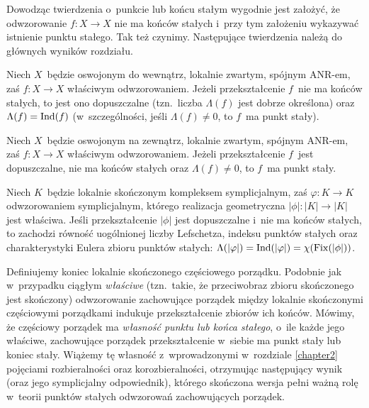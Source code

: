 Dowodząc twierdzenia o~punkcie lub końcu stałym wygodnie jest założyć, że odwzorowanie $f\colon X\to X$ nie ma końców stałych i~przy tym założeniu wykazywać istnienie punktu stałego. Tak też czynimy. Następujące twierdzenia należą do głównych wyników rozdziału.

\begin{tw*}[\ref{tw-lefschetz_fpt_dla_reverse_tame}]
Niech $X$~będzie oswojonym do wewnątrz, lokalnie zwartym, spójnym \mbox{ANR-em}, zaś $f\colon X\to X$ właściwym odwzorowaniem. Jeżeli przekształcenie $f$~nie ma końców stałych, to jest ono dopuszczalne (tzn.~liczba $\Lambda(f)$ jest dobrze określona) oraz~$\Lambda(f)=\operatorname{Ind}(f)$ (w~szczególności, jeśli $\Lambda(f)\not=0$, to $f$~ma punkt stały).
\end{tw*}

\begin{tw*}[\ref{tw-lefschetz_fpt_dla_forward_tame}]
Niech $X$~będzie oswojonym na zewnątrz, lokalnie zwartym, spójnym \mbox{ANR-em}, zaś $f\colon X\to X$ właściwym odwzorowaniem. Jeżeli przekształcenie $f$~jest dopuszczalne, nie ma końców stałych oraz $\Lambda(f)\not=0$, to $f$~ma punkt stały.
\end{tw*}

\begin{tw*}[\ref{wn-simplicial-fixed-point-or-end-theorem}, \ref{tw-rownosc_indeksu_i_l_lefschetza_odwz_sympl}]
Niech $K$~będzie lokalnie skończonym kompleksem symplicjalnym, zaś $\varphi\colon K\to K$ odwzorowaniem symplicjalnym, którego realizacja geometryczna $|\phi|\colon |K|\to |K|$ jest właściwa. Jeśli przekształcenie $|\phi|$ jest dopuszczalne i~nie ma końców stałych, to zachodzi równość uogólnionej liczby Lefschetza, indeksu punktów stałych oraz charakterystyki Eulera zbioru punktów stałych: $\Lambda(|\varphi|)=\operatorname{Ind}(|\varphi|)=\chi(\operatorname{Fix}(|\phi|))$.
\end{tw*}

Definiujemy koniec lokalnie skończonego częściowego porządku. Podobnie jak w~przypadku ciągłym \textit{właściwe} (tzn.~takie, że przeciwobraz zbioru skończonego jest skończony) odwzorowanie zachowujące porządek między lokalnie skończonymi częściowymi porządkami indukuje przekształcenie zbiorów ich końców. Mówimy, że częściowy porządek ma \textit{własność punktu lub końca stałego}, o~ile każde jego właściwe, zachowujące porządek przekształcenie w~siebie ma punkt stały lub koniec stały. Wiążemy tę własność z~wprowadzonymi w~rozdziale \ref{chapter2} pojęciami rozbieralności oraz korozbieralności, otrzymując następujący wynik (oraz jego symplicjalny odpowiednik), którego skończona wersja \cite[Theorem 4.2.5]{Schroder03} pełni ważną rolę w~teorii punktów stałych odwzorowań zachowujących porządek.

